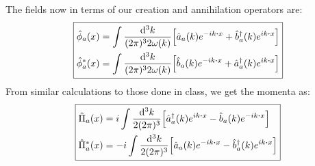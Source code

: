 \documentclass[12pt]{article}
\newcommand{\phih}{\hat{\phi}}
\newcommand{\phish}{\hat{\phi}^*}
\newcommand{\pih}{\hat{\Pi}}
\newcommand{\pish}{\hat{\Pi}^*}
\newcommand{\ahat}{\hat{a}}
\newcommand{\ahatd}{\hat{a}^\dag}
\newcommand{\bhat}{\hat{b}}
\newcommand{\bhatd}{\hat{b}^\dag}
\newcommand{\intk}{\int\frac{\dd[3]{k}}{(2\pi)^32\omega(k)}}
\newcommand{\intkp}{\int\frac{\dd[3]{k}}{2(2\pi)^3}}
\begin{document}
The fields now in terms of our creation and annihilation operators are:
\begin{equation*}
  \boxed {
    \begin{aligned}
      \phih_a(x)&=\intk\qty[\ahat_a(k)e^{-ik\vdot x}+\bhatd_a(k)e^{ik\vdot x}]\\
      \phish_a(x)&=\intk\qty[\bhat_a(k)e^{-ik\vdot x}+\ahatd_a(k)e^{ik\vdot x}]
    \end{aligned}
  }
\end{equation*}
From similar calculations to those done in class, we get the momenta as:
\begin{equation*}
  \boxed{
    \begin{aligned}
      \pih_a(x)&=i\intkp\qty[\ahatd_a(k)e^{ik\vdot x}-\bhat_a(k)e^{-ik\vdot x}]\\
      \pish_a(x)&=-i\intkp\qty[\ahat_a(k)e^{-ik\vdot x}-\bhatd_a(k)e^{ik\vdot x}]
    \end{aligned}
  }
\end{equation*}
\end{document}

